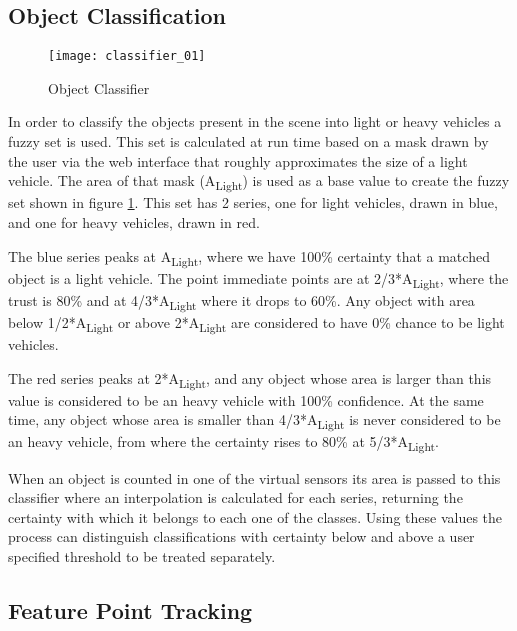 \subsection{Object Classification}

\begin{figure}[h]
  \begin{center}
    \leavevmode
    \texttt{[image: classifier\_01]}
    \caption{Object Classifier}
    \label{fig:object_classifier}
  \end{center}
\end{figure}

In order to classify the objects present in the scene into light or heavy vehicles a fuzzy set is used. This set is calculated at run time based on a mask drawn by the user via the web interface that roughly approximates the size of a light vehicle. The area of that mask (A\textsubscript{Light}) is used as a base value to create the fuzzy set shown in figure \ref{fig:object_classifier}. This set has 2 series, one for light vehicles, drawn in blue, and one for heavy vehicles, drawn in red.

The blue series peaks at A\textsubscript{Light}, where we have 100\% certainty that a matched object is a light vehicle. The point immediate points are at 2/3*A\textsubscript{Light}, where the trust is 80\% and at 4/3*A\textsubscript{Light} where it drops to 60\%. Any object with area below 1/2*A\textsubscript{Light} or above 2*A\textsubscript{Light} are considered to have 0\% chance to be light vehicles.

The red series peaks at 2*A\textsubscript{Light}, and any object whose area is larger than this value is considered to be an heavy vehicle with 100\% confidence. At the same time, any object whose area is smaller than 4/3*A\textsubscript{Light} is never considered to be an heavy vehicle, from where the certainty rises to 80\% at 5/3*A\textsubscript{Light}.

When an object is counted in one of the virtual sensors its area is passed to this classifier where an interpolation is calculated for each series, returning the certainty with which it belongs to each one of the classes. Using these values the process can distinguish classifications with certainty below and above a user specified threshold to be treated separately.

\subsection{Feature Point Tracking}

